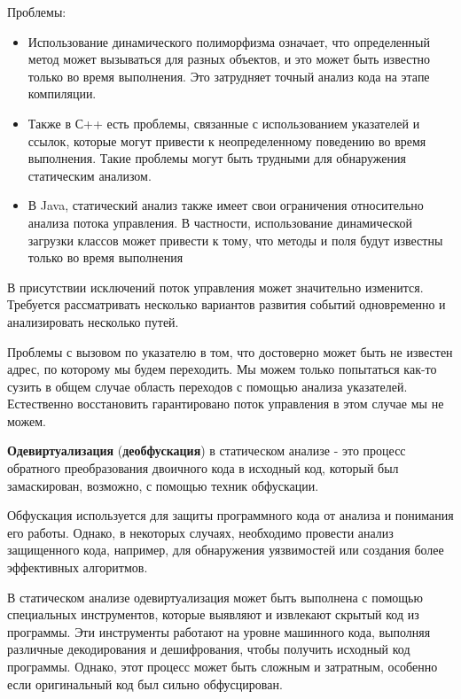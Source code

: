 
Проблемы:
\begin{itemize}
    \item Использование динамического полиморфизма означает, что определенный метод может вызываться для разных объектов, и это может быть известно только во время выполнения. Это затрудняет точный анализ кода на этапе компиляции.
    
    \item Также в С++ есть проблемы, связанные с использованием указателей и ссылок, которые могут привести к неопределенному поведению во время выполнения. Такие проблемы могут быть трудными для обнаружения статическим анализом.
    \item В Java, статический анализ также имеет свои ограничения относительно анализа потока управления. В частности, использование динамической загрузки классов может привести к тому, что методы и поля будут известны только во время выполнения
\end{itemize}

В присутствии исключений поток управления может значительно изменится. Требуется рассматривать несколько вариантов развития событий одновременно и анализировать несколько путей.

Проблемы с вызовом по указателю в том, что достоверно может быть не известен адрес, по которому мы будем переходить. Мы можем только попытаться как-то сузить в общем случае область переходов с помощью анализа указателей. Естественно восстановить гарантировано поток управления в этом случае мы не можем.

\textbf{Одевиртуализация} (\textbf{деобфускация}) в статическом анализе - это процесс обратного преобразования двоичного кода в исходный код, который был замаскирован, возможно, с помощью техник обфускации.

Обфускация используется для защиты программного кода от анализа и понимания его работы. Однако, в некоторых случаях, необходимо провести анализ защищенного кода, например, для обнаружения уязвимостей или создания более эффективных алгоритмов.

В статическом анализе одевиртуализация может быть выполнена с помощью специальных инструментов, которые выявляют и извлекают скрытый код из программы. Эти инструменты работают на уровне машинного кода, выполняя различные декодирования и дешифрования, чтобы получить исходный код программы. Однако, этот процесс может быть сложным и затратным, особенно если оригинальный код был сильно обфусцирован.